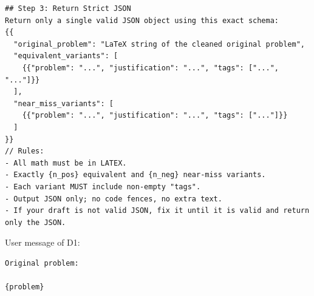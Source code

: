 \begin{Verbatim}[breaklines=true,breakanywhere=true,fontsize=\small]
## Step 3: Return Strict JSON
Return only a single valid JSON object using this exact schema:
{{
  "original_problem": "LaTeX string of the cleaned original problem",
  "equivalent_variants": [
    {{"problem": "...", "justification": "...", "tags": ["...", "..."]}}
  ],
  "near_miss_variants": [
    {{"problem": "...", "justification": "...", "tags": ["..."]}}
  ]
}}
// Rules:
- All math must be in LATEX.
- Exactly {n_pos} equivalent and {n_neg} near-miss variants.
- Each variant MUST include non-empty "tags".
- Output JSON only; no code fences, no extra text.
- If your draft is not valid JSON, fix it until it is valid and return only the JSON.
\end{Verbatim}

User message of D1:
\begin{Verbatim}[breaklines=true,breakanywhere=true,fontsize=\small]
Original problem:

{problem}
\end{Verbatim}

